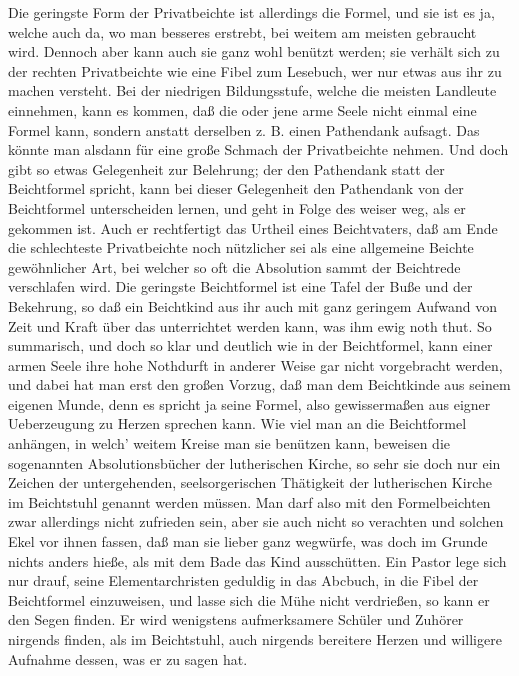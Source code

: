 Die geringste Form der Privatbeichte ist allerdings die Formel, und sie ist es ja, welche auch da, wo man besseres erstrebt, bei weitem am meisten gebraucht wird. Dennoch aber kann auch sie ganz wohl benützt werden; sie verhält sich zu der rechten Privatbeichte wie eine Fibel zum Lesebuch, wer nur etwas aus ihr zu machen versteht. Bei der niedrigen Bildungsstufe, welche die meisten Landleute einnehmen, kann es kommen, daß die oder jene arme Seele nicht einmal eine Formel kann, sondern anstatt derselben z. B. einen Pathendank aufsagt. Das könnte man alsdann für eine große
Schmach der Privatbeichte nehmen. Und doch gibt so etwas Gelegenheit zur Belehrung; der den Pathendank statt der Beichtformel spricht, kann bei dieser Gelegenheit den Pathendank von der Beichtformel unterscheiden lernen, und geht in Folge des weiser weg, als er gekommen ist. Auch er rechtfertigt das Urtheil eines Beichtvaters, daß am Ende die schlechteste Privatbeichte noch nützlicher sei als eine allgemeine Beichte gewöhnlicher Art, bei welcher so oft die Absolution sammt der Beichtrede verschlafen wird. Die geringste Beichtformel ist eine Tafel der Buße und der Bekehrung, so daß ein Beichtkind aus ihr auch mit ganz geringem Aufwand von Zeit und Kraft über das unterrichtet werden kann, was ihm ewig noth thut. So summarisch, und doch so klar und deutlich wie in der Beichtformel, kann einer armen Seele ihre hohe Nothdurft in anderer Weise gar nicht vorgebracht werden, und dabei hat man erst den großen Vorzug, daß man dem Beichtkinde aus seinem eigenen Munde, denn es spricht ja seine Formel, also gewissermaßen aus eigner Ueberzeugung zu Herzen sprechen kann. Wie viel man an die Beichtformel anhängen, in welch’ weitem Kreise man sie benützen kann, beweisen die sogenannten Absolutionsbücher der lutherischen Kirche, so sehr sie doch nur ein Zeichen der untergehenden, seelsorgerischen Thätigkeit der lutherischen Kirche im Beichtstuhl genannt werden müssen. Man darf also mit den Formelbeichten zwar allerdings nicht zufrieden sein, aber sie auch nicht so verachten und solchen Ekel vor ihnen fassen, daß man sie lieber ganz wegwürfe, was doch im Grunde nichts anders hieße, als mit dem Bade das Kind ausschütten. Ein Pastor
lege sich nur drauf, seine Elementarchristen geduldig in das Abcbuch, in die Fibel der Beichtformel einzuweisen, und lasse sich die Mühe nicht verdrießen, so kann er den Segen finden. Er wird wenigstens aufmerksamere Schüler und Zuhörer nirgends finden, als im Beichtstuhl, auch nirgends bereitere Herzen und willigere Aufnahme dessen, was er zu sagen hat.

